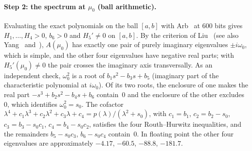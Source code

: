 \documentclass[11pt,a4paper]{report}
\begin{document}
\paragraph{Step 2: the spectrum at $\mu_0$ (ball arithmetic).} Evaluating the exact polynomials on the ball $[a,b]$ with Arb~\autocite{Arb2017} at 600 bits gives $H_1,\dots,H_4>0$, $b_6>0$ and $H_5'\ne0$ on $[a,b]$. By the criterion of Liu~\autocite{Liu1994} (see also Yang~\autocite{Yang2002} and~\autocite[Prop.~2.3]{CMS2019}), $A(\mu_0)$ has exactly one pair of purely imaginary eigenvalues $\pm i\omega_0$, which is simple, and the other four eigenvalues have negative real parts; with $H_5'(\mu_0)\ne0$ the pair crosses the imaginary axis transversally. As an independent check, $\omega_0^2$ is a root of $b_1s^2-b_3s+b_5$ (imaginary part of the characteristic polynomial at $i\omega_0$). Of its two roots, the enclosure of one makes the real part $-s^3+b_2s^2-b_4s+b_6$ contain~$0$ and the enclosure of the other excludes~$0$, which identifies $\omega_0^2=s_0$. The cofactor $\lambda^4+c_1\lambda^3+c_2\lambda^2+c_3\lambda+c_4=p(\lambda)/(\lambda^2+s_0)$, with $c_1=b_1$, $c_2=b_2-s_0$, $c_3=b_3-s_0c_1$, $c_4=b_4-s_0c_2$, satisfies the four Routh--Hurwitz inequalities, and the remainders $b_5-s_0c_3$, $b_6-s_0c_4$ contain~$0$. In floating point the other four eigenvalues are approximately $-4.17$, $-60.5$, $-88.8$, $-181.7$.
\end{document}
